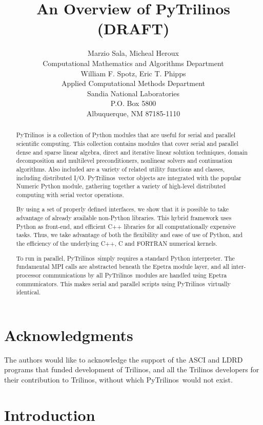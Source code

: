 \documentclass[10pt,relax]{SANDreport}
\author{Marzio Sala, Micheal Heroux\\
Computational Mathematics and Algorithms Department \\ [10pt]
William F. Spotz, Eric T. Phipps \\
Applied Computational Methods Department \\ [10pt]
Sandia National Laboratories \\
P.O. Box 5800 \\
Albuquerque, NM 87185-1110 \\
}
\title{An Overview of PyTrilinos (DRAFT)}
\newcommand{\PyTrilinos}{{PyTrilinos}}
\begin{document}
\maketitle

\begin{abstract}
\PyTrilinos\ is a collection of Python modules that are useful for
serial and parallel scientific computing. This collection contains
modules that cover serial and parallel dense and sparse linear
algebra, direct and iterative linear solution techniques, domain
decomposition and multilevel preconditioners, nonlinear solvers and
continuation algorithms. Also included are a variety of related
utility functions and classes, including distributed I/O.
\PyTrilinos\ vector objects are integrated with the popular Numeric
Python module, gathering together a variety of high-level distributed
computing with serial vector operations.

By using a set of properly defined interfaces, we show that it is
possible to take advantage of already available non-Python
libraries. This hybrid framework uses Python as front-end, and
efficient C++ libraries for all computationally expensive tasks. Thus,
we take advantage of both the flexibility and ease of use of Python,
and the efficiency of the underlying C++, C and FORTRAN numerical
kernels.

To run in parallel, \PyTrilinos\ simply requires a standard Python
interpreter.  The fundamental MPI calls are abstracted beneath the
Epetra module layer, and all inter-processor communications by all
\PyTrilinos\ modules are handled using Epetra communicators. This
makes serial and parallel scripts using \PyTrilinos\ virtually
identical.
\end{abstract}

\clearpage
\section*{Acknowledgments}
The authors would like to acknowledge the support of the ASCI and LDRD
programs that funded development of Trilinos, and all the Trilinos
developers for their contribution to Trilinos, without which
\PyTrilinos\ would not exist.

\medskip

\SANDmain
\tableofcontents
\newpage

\section{Introduction}
\label{sec:intro}
\end{document}
